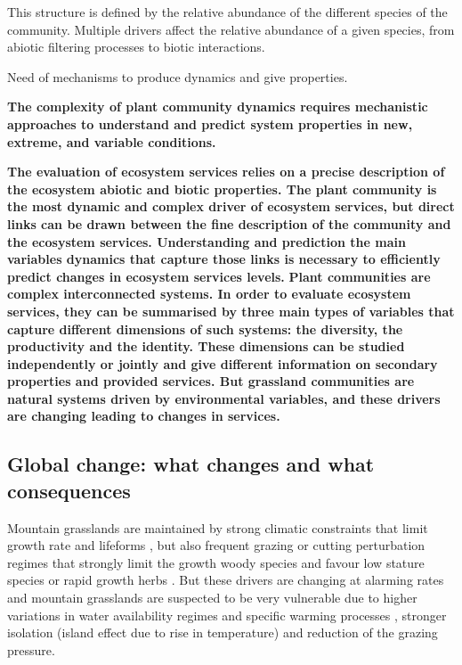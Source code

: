 This structure is defined by the relative abundance of the different species of the community. Multiple drivers affect the relative abundance of a given species, from abiotic filtering processes to biotic interactions. 

Need of mechanisms to produce dynamics and give properties.

\textbf{The complexity of plant community dynamics requires mechanistic approaches to understand and predict system properties in new, extreme, and variable conditions. }


\textbf{The evaluation of ecosystem services relies on a precise description of the ecosystem abiotic and biotic properties. The plant community is the most dynamic and complex driver of ecosystem services, but direct links can be drawn between the fine description of the community and the ecosystem services. Understanding and prediction the main variables dynamics that capture those links is necessary to efficiently predict changes in ecosystem services levels.}
\textbf{Plant communities are complex interconnected systems. In order to evaluate ecosystem services, they can be summarised by three main types of variables that capture different dimensions of such systems: the diversity, the productivity and the identity. These dimensions can be studied independently or jointly and give different information on secondary properties and provided services. But grassland communities are natural systems driven by environmental variables, and these drivers are changing leading to changes in services.}



\subsection{Global change: what changes and what consequences}

Mountain grasslands are maintained by strong climatic constraints that limit growth rate and lifeforms  \parencite{koorner_alpine_2003}, but also frequent grazing or cutting perturbation regimes that strongly limit the growth woody species and favour low stature species or rapid growth herbs \parencite{diaz_plant_2007}. But these drivers are changing at alarming rates and mountain grasslands are suspected to be very vulnerable \parencite{engler_21st_2011} due to higher variations in water availability regimes and specific warming processes \parencite{mountain_research_initiative_edw_working_group_elevation-dependent_2015}, stronger isolation (island effect due to rise in temperature) and reduction of the grazing pressure.

